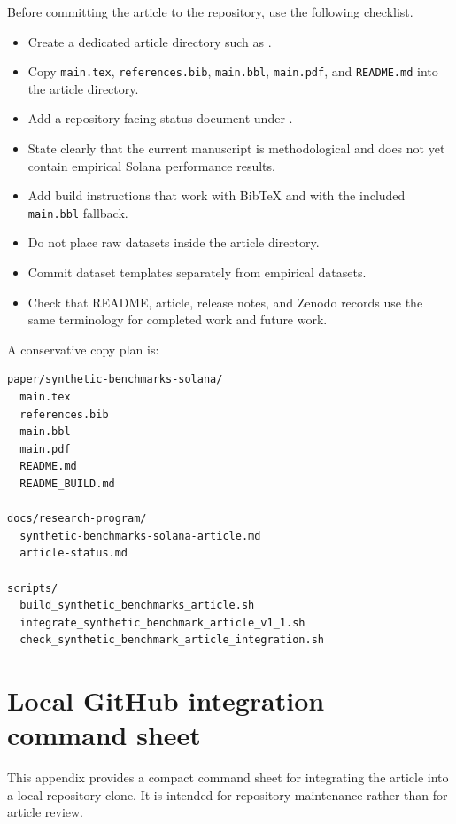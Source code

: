 \documentclass[11pt,a4paper]{article}
\begin{document}
Before committing the article to the repository, use the following checklist.

\begin{itemize}
  \item Create a dedicated article directory such as .
  \item Copy \texttt{main.tex}, \texttt{references.bib}, \texttt{main.bbl}, \texttt{main.pdf}, and \texttt{README.md} into the article directory.
  \item Add a repository-facing status document under .
  \item State clearly that the current manuscript is methodological and does not yet contain empirical Solana performance results.
  \item Add build instructions that work with BibTeX and with the included \texttt{main.bbl} fallback.
  \item Do not place raw datasets inside the article directory.
  \item Commit dataset templates separately from empirical datasets.
  \item Check that README, article, release notes, and Zenodo records use the same terminology for completed work and future work.
\end{itemize}

A conservative copy plan is:

\begin{verbatim}
paper/synthetic-benchmarks-solana/
  main.tex
  references.bib
  main.bbl
  main.pdf
  README.md
  README_BUILD.md

docs/research-program/
  synthetic-benchmarks-solana-article.md
  article-status.md

scripts/
  build_synthetic_benchmarks_article.sh
  integrate_synthetic_benchmark_article_v1_1.sh
  check_synthetic_benchmark_article_integration.sh
\end{verbatim}

\section{Local GitHub integration command sheet}
\label{app:github-command-sheet}

This appendix provides a compact command sheet for integrating the article into a local repository clone. It is intended for repository maintenance rather than for article review.
\end{document}
